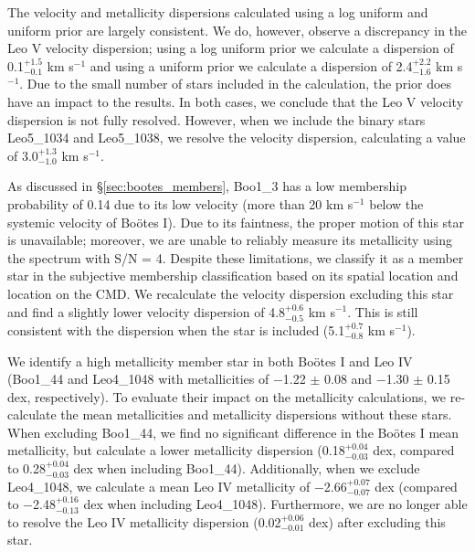 \documentclass[twocolumn]{aastex63}
\newcommand{\revise}[1]{#1}
\begin{document}
The velocity and metallicity dispersions calculated using a log uniform  and uniform prior are largely consistent. We do, however, observe a discrepancy in the Leo V velocity dispersion; using a log uniform prior we calculate a dispersion of \revise{0.1$^{+1.5}_{-0.1}$ km s$^{-1}$} and using a uniform prior we calculate a dispersion of \revise{2.4$^{+2.2}_{-1.6}$ km s$^{-1}$}. Due to the small number of stars included in the calculation, the prior does have an impact to the results. In both cases, we conclude that the Leo V velocity dispersion is not fully resolved. However, when we include the binary stars Leo5\_1034 and Leo5\_1038, we resolve the velocity dispersion, calculating a value of 3.0$^{+1.3}_{-1.0}$ km s$^{-1}$. 

As discussed in \S\ref{sec:bootes_members}, Boo1\_3 has a low membership probability of 0.14 due to its low velocity (more than 20 km s$^{-1}$ below the systemic velocity of Bo{\"o}tes I). Due to its faintness, the proper motion of this star is unavailable; moreover, we are unable to reliably measure its metallicity using the spectrum with S/N = 4. Despite these limitations, we classify it as a member star in the subjective membership classification based on its spatial location and location on the CMD. We recalculate the velocity dispersion excluding this star and find a slightly lower velocity dispersion of 4.8$^{+0.6}_{-0.5}$ km s$^{-1}$. This is still consistent with the dispersion when the star is included (\revise{5.1$^{+0.7}_{-0.8}$ km s$^{-1}$}).

We identify a high metallicity member star in both Bo{\"o}tes I and Leo IV (Boo1\_44 and Leo4\_1048 with metallicities of $-$1.22 $\pm$ 0.08 and $-$1.30 $\pm$ 0.15 dex, respectively). To evaluate their impact on the metallicity calculations, we re-calculate the mean metallicities and metallicity dispersions without these stars. When excluding Boo1\_44, we find no significant difference in the Bo{\"o}tes I mean metallicity, but calculate a lower metallicity dispersion (0.18$^{+0.04}_{-0.03}$ dex,  compared to \revise{0.28$^{+0.04}_{-0.03}$ dex} when including Boo1\_44). Additionally, when we exclude Leo4\_1048, we calculate a mean Leo IV metallicity of $-$2.66$^{+0.07}_{-0.07}$ dex (compared to \revise{$-$2.48$^{+0.16}_{-0.13}$ dex} when including Leo4\_1048). Furthermore, we are no longer able to resolve the Leo IV metallicity dispersion (0.02$^{+0.06}_{-0.01}$ dex) after excluding this star.
\end{document}
